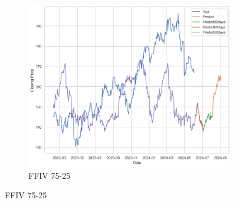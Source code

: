 \documentclass{ieeeojies}
\begin{document}
\begin{figure}[H]
    \hfill
    \begin{subfigure}[b]{0.33\linewidth}
        \centering
        \includegraphics[width=\linewidth]{ETS Plot/FFIV_ETS_75_25.png}
        \caption{FFIV 75-25}
        \label{fig:ffiv-75-25}
    \end{subfigure}
\end{figure}
\end{document}
